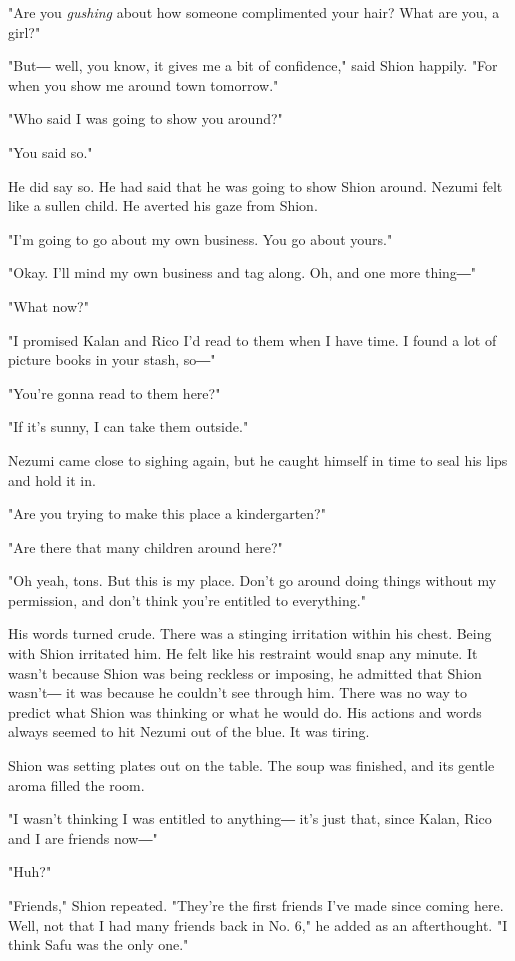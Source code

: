"Are you \emph{gushing} about how someone complimented your hair? What are you,
a girl?"

"But― well, you know, it gives me a bit of confidence," said Shion
happily. "For when you show me around town tomorrow."

"Who said I was going to show you around?"

"You said so."

He did say so. He had said that he was going to show Shion around.
Nezumi felt like a sullen child. He averted his gaze from Shion.

"I'm going to go about my own business. You go about yours."

"Okay. I'll mind my own business and tag along. Oh, and one more thing―"

"What now?"

"I promised Kalan and Rico I'd read to them when I have time. I found a
lot of picture books in your stash, so―"

"You're gonna read to them here?"

"If it's sunny, I can take them outside."

Nezumi came close to sighing again, but he caught himself in time to
seal his lips and hold it in.

"Are you trying to make this place a kindergarten?"

"Are there that many children around here?"

"Oh yeah, tons. But this is my place. Don't go around doing things
without my permission, and don't think you're entitled to everything."

His words turned crude. There was a stinging irritation within his
chest. Being with Shion irritated him. He felt like his restraint would
snap any minute. It wasn't because Shion was being reckless or imposing,
he admitted that Shion wasn't― it was because he couldn't see through
him. There was no way to predict what Shion was thinking or what he
would do. His actions and words always seemed to hit Nezumi out of the
blue. It was tiring.

Shion was setting plates out on the table. The soup was finished, and
its gentle aroma filled the room.

"I wasn't thinking I was entitled to anything― it's just that, since
Kalan, Rico and I are friends now―"

"Huh?"

"Friends," Shion repeated. "They're the first friends I've made since
coming here. Well, not that I had many friends back in No. 6," he added
as an afterthought. "I think Safu was the only one."

